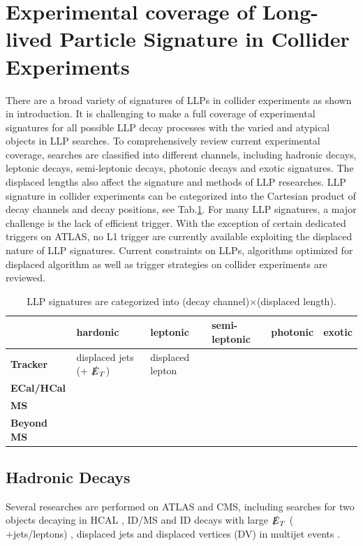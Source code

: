 \section{Experimental coverage of Long-lived Particle Signature in Collider Experiments}

There are a broad variety of signatures of LLPs in collider experiments as shown in introduction. It is challenging to make a full coverage of experimental signatures for all possible LLP decay processes with the varied and atypical objects in LLP searches. To comprehensively review current experimental coverage, searches are classified into different channels, including hadronic decays, leptonic decays, semi-leptonic decays, photonic decays and exotic signatures. The displaced lengths also affect the signature and methods of LLP researches. LLP signature in collider experiments can be categorized into the Cartesian product of decay channels and decay positions, see Tab.\ref{tab:LLPsignature}. For many LLP signatures, a major challenge is the lack of efficient trigger. With the exception of certain dedicated triggers on ATLAS, no L1 trigger are currently available exploiting the displaced nature of LLP signatures. Current constraints on LLPs, algorithms optimized for displaced algorithm as well as trigger strategies on collider experiments are reviewed.

\begin{table}[!htbp]
    \centering
    \caption{LLP signatures are categorized into (decay channel)$\times$(displaced length).}
    \begin{tabular}{|p{2.5cm}|p{2.5cm}|p{2.5cm}|p{2.5cm}|p{2.5cm}|p{2.5cm}|}
        \hline
                        & \textbf{hardonic}  & \textbf{leptonic} & \textbf{semi-leptonic} & \textbf{photonic} & \textbf{exotic}    \\
        \hline
        \textbf{Tracker}    & displaced jets (+ $\slashed{E}_T$) & displaced lepton & & &            \\
        \hline
        \textbf{ECal/HCal}  &    & & & &           \\
        \hline
        \textbf{MS}         &     & & & &          \\
        \hline
        \textbf{Beyond MS}  &     & & & &          \\
        \hline
        \end{tabular}
    \label{tab:LLPsignature}
\end{table}

\subsection{Hadronic Decays}
Several researches are performed on ATLAS and CMS, including searches for two objects decaying in HCAL \cite{Aaboud:2019opc,Aad:2015asa}, ID/MS \cite{Aad:2015uaa,Aaboud:2018aqj} and ID decays with large $\slashed{E}_T$ ( +jets/leptons) \cite{Aaboud:2017iio,Aad:2015rba} , displaced jets \cite{Sirunyan:2018vlw,Sirunyan:2017jdo,CMS:2014wda} and displaced vertices (DV) in multijet events \cite{Sirunyan:2018pwn}. 

